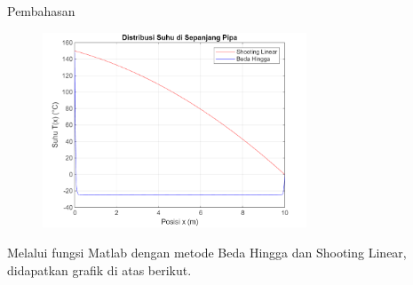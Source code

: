 \documentclass[xcolor={dvipsnames}, 9pt]{beamer}
\begin{document}
	\begin{frame}{Pembahasan}
		\begin{figure}[h] 
			\centering
			\includegraphics[width=0.7\textwidth]{Pipa.png}
		\end{figure}
		Melalui fungsi Matlab dengan metode Beda Hingga dan Shooting Linear, didapatkan grafik di atas berikut.
	\end{frame}
	
\end{document}
